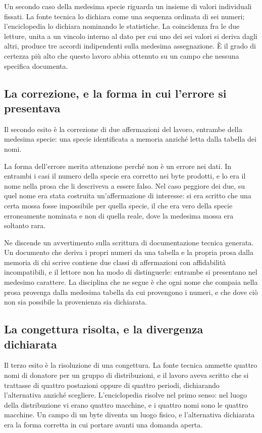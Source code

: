 Un secondo caso della medesima specie riguarda un insieme di valori individuali fissati. La fonte tecnica lo dichiara come una sequenza ordinata di sei numeri; l'enciclopedia lo dichiara nominando le statistiche. La coincidenza fra le due letture, unita a un vincolo interno al dato per cui uno dei sei valori si deriva dagli altri, produce tre accordi indipendenti sulla medesima assegnazione. È il grado di certezza più alto che questo lavoro abbia ottenuto su un campo che nessuna specifica documenta.

\subsection*{La correzione, e la forma in cui l'errore si presentava}

Il secondo esito è la correzione di due affermazioni del lavoro, entrambe della medesima specie: una specie identificata a memoria anziché letta dalla tabella dei nomi.

La forma dell'errore merita attenzione perché non è un errore nei dati. In entrambi i casi il numero della specie era corretto nei byte prodotti, e lo era il nome nella prosa che li descriveva a essere falso. Nel caso peggiore dei due, su quel nome era stata costruita un'affermazione di interesse: si era scritto che una certa mossa fosse impossibile per quella specie, il che era vero della specie erroneamente nominata e non di quella reale, dove la medesima mossa era soltanto rara.

Ne discende un avvertimento sulla scrittura di documentazione tecnica generata. Un documento che deriva i propri numeri da una tabella e la propria prosa dalla memoria di chi scrive contiene due classi di affermazioni con affidabilità incompatibili, e il lettore non ha modo di distinguerle: entrambe si presentano nel medesimo carattere. La disciplina che ne segue è che ogni nome che compaia nella prosa provenga dalla medesima tabella da cui provengono i numeri, e che dove ciò non sia possibile la provenienza sia dichiarata.

\subsection*{La congettura risolta, e la divergenza dichiarata}

Il terzo esito è la risoluzione di una congettura. La fonte tecnica ammette quattro nomi di donatore per un gruppo di distribuzioni, e il lavoro aveva scritto che si trattasse di quattro postazioni oppure di quattro periodi, dichiarando l'alternativa anziché scegliere. L'enciclopedia risolve nel primo senso: nel luogo della distribuzione vi erano quattro macchine, e i quattro nomi sono le quattro macchine. Un campo di un byte diventa un luogo fisico, e l'alternativa dichiarata era la forma corretta in cui portare avanti una domanda aperta.

